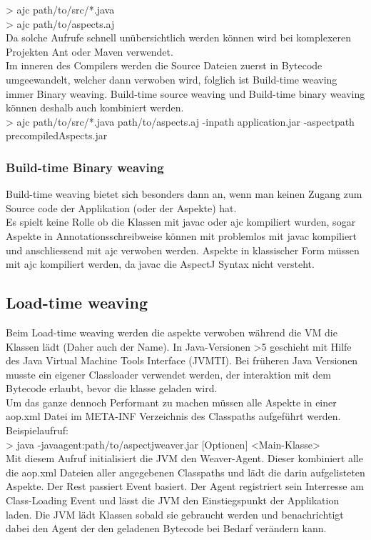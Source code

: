 > ajc path/to/src/*.java\\

> ajc path/to/aspects.aj\\

Da solche Aufrufe schnell unübersichtlich werden können wird bei komplexeren Projekten Ant oder Maven verwendet.\\
Im inneren des Compilers werden die Source Dateien zuerst in Bytecode umgeewandelt, welcher dann verwoben wird, folglich ist Build-time weaving immer Binary weaving. Build-time source weaving und Build-time binary weaving können deshalb auch kombiniert werden.\\
> ajc path/to/src/*.java path/to/aspects.aj -inpath application.jar -aspectpath precompiledAspects.jar

\subsubsection*{Build-time Binary weaving}
Build-time weaving bietet sich besonders dann an, wenn man keinen Zugang zum Source code der Applikation (oder der Aspekte) hat.\\
Es spielt keine Rolle ob die Klassen mit javac oder ajc kompiliert wurden, sogar Aspekte in Annotationsschreibweise können mit problemlos mit javac kompiliert und anschliessend mit ajc verwoben werden. Aspekte in klassischer Form müssen mit ajc kompiliert werden, da javac die AspectJ Syntax nicht versteht.


\subsection{Load-time weaving}

Beim Load-time weaving werden die aspekte verwoben während die VM die Klassen lädt (Daher auch der Name). In Java-Versionen >5 geschieht mit Hilfe des Java Virtual Machine Tools Interface (JVMTI). Bei früheren Java Versionen musste ein eigener Classloader verwendet werden, der interaktion mit dem Bytecode erlaubt, bevor die klasse geladen wird.\\
Um das ganze dennoch Performant zu machen müssen alle Aspekte in einer aop.xml Datei im META-INF Verzeichnis des Classpaths aufgeführt werden.\\

Beispielaufruf:\\
> java -javaagent:path/to/aspectjweaver.jar [Optionen] <Main-Klasse>\\
Mit diesem Aufruf initialisiert die JVM den Weaver-Agent.
Dieser kombiniert alle die aop.xml Dateien aller angegebenen Classpaths und lädt die darin aufgelisteten Aspekte. Der Rest passiert Event basiert. Der Agent registriert sein Interresse am Class-Loading Event und lässt die JVM den Einstiegspunkt der Applikation laden. Die JVM lädt Klassen sobald sie gebraucht werden und benachrichtigt dabei den Agent der den geladenen Bytecode  bei Bedarf verändern kann.

